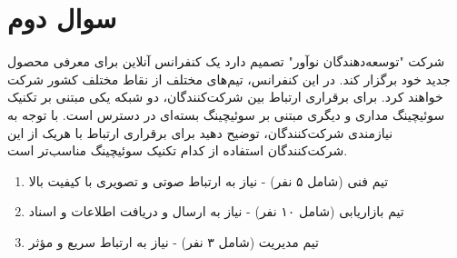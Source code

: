 \section{سوال دوم}
شرکت "توسعه‌دهندگان نوآور" تصمیم دارد یک کنفرانس آنلاین برای معرفی محصول جدید خود برگزار کند. در این کنفرانس، تیم‌های مختلف از نقاط مختلف کشور شرکت خواهند کرد. برای برقراری ارتباط بین شرکت‌کنندگان، دو شبکه یکی مبتنی بر تکنیک سوئیچینگ مداری و دیگری مبتنی بر سوئیچینگ بسته‌ای در دسترس است. با توجه به نیازمندی شرکت‌کنندگان، توضیح دهید برای برقراری ارتباط با هریک از این شرکت‌کنندگان استفاده از کدام تکنیک سوئیچینگ مناسب‌تر است.

\begin{enumerate}
	\item 
	تیم فنی (شامل ۵ نفر) - نیاز به ارتباط صوتی و تصویری با کیفیت بالا
	\begin{qsolve}
		
	\end{qsolve}
	
	\item 
	تیم بازاریابی (شامل ۱۰ نفر) - نیاز به ارسال و دریافت اطلاعات و اسناد
	\begin{qsolve}
		
	\end{qsolve}
	
	\item 
	تیم مدیریت (شامل ۳ نفر) - نیاز به ارتباط سریع و مؤثر
	\begin{qsolve}
		
	\end{qsolve}
\end{enumerate}